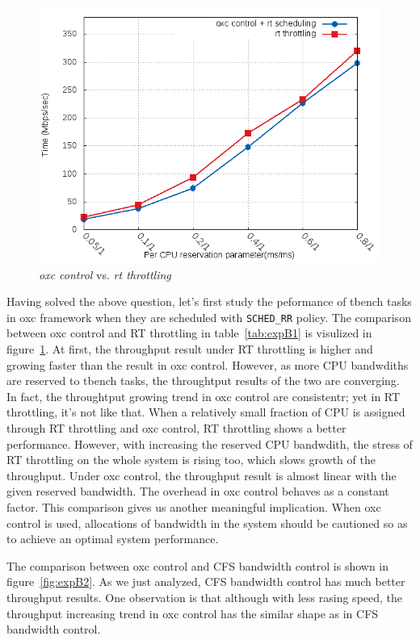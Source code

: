 \begin{figure}[htbp]
        \centering
        \includegraphics[width=\textwidth,totalheight=0.4\textheight]{images/expB1}
        \caption{\emph{oxc control} vs. \emph{rt throttling}}
        \label{fig:expB1}
\end{figure}

Having solved the above question, let's first study the peformance of tbench 
tasks in oxc framework when they are scheduled with \texttt{SCHED\_RR} 
policy. The comparison between oxc control and RT throttling in 
table~\ref{tab:expB1} is visulized in figure~\ref{fig:expB1}.
At first, the throughput result under RT throttling is higher and 
growing faster than the result in oxc control. However, as more CPU 
bandwdiths are reserved to tbench tasks, the throughtput results of the 
two are converging. In fact, the throughtput growing trend in oxc 
control are consistentr; yet in RT throttling, it's not like that.
When a relatively small fraction of CPU is assigned through RT throttling
and oxc control, RT throttling shows a better performance. However, with
increasing the reserved CPU bandwdith, the stress of RT throttling on
the whole system is rising too, which slows growth of the throughput. 
Under oxc control, the throughput result is almost linear with the 
given reserved bandwidth. The overhead in oxc control behaves as 
a constant factor.
This comparison gives us another meaningful implication. 
When oxc control is used, allocations of bandwidth in the system should be
cautioned so as to achieve an optimal system performance. 

The comparison between oxc control and CFS bandwidth control is shown 
in figure~\ref{fig:expB2}. As we just analyzed, CFS bandwidth control has
much better throughput results. One observation is that although with
less rasing speed, the throughput increasing trend in oxc control has the
similar shape as in CFS bandwidth control. 

